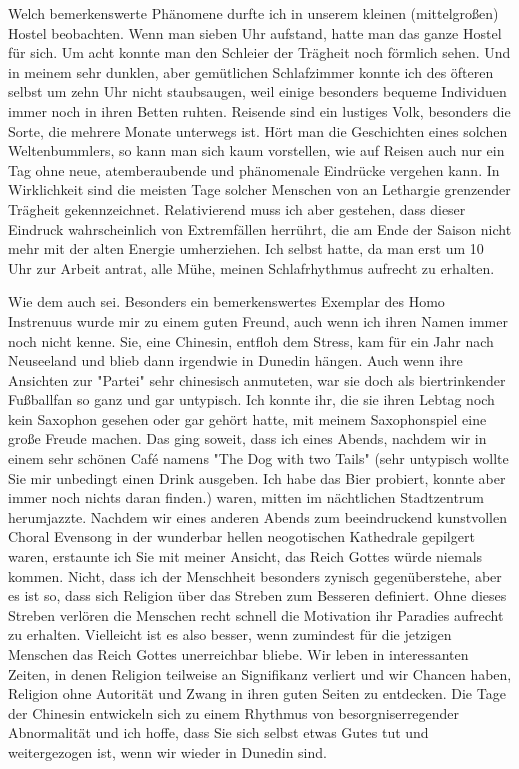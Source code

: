 Welch bemerkenswerte Phänomene durfte ich in unserem kleinen
(mittelgroßen) Hostel beobachten. Wenn man sieben Uhr aufstand, hatte
man das ganze Hostel für sich. Um acht konnte man den Schleier der
Trägheit noch förmlich sehen. Und in meinem sehr dunklen, aber
gemütlichen Schlafzimmer konnte ich des öfteren selbst um zehn Uhr nicht
staubsaugen, weil einige besonders bequeme Individuen immer noch in
ihren Betten ruhten. Reisende sind ein lustiges Volk, besonders die
Sorte, die mehrere Monate unterwegs ist. Hört man die Geschichten eines
solchen Weltenbummlers, so kann man sich kaum vorstellen, wie auf Reisen
auch nur ein Tag ohne neue, atemberaubende und phänomenale Eindrücke
vergehen kann. In Wirklichkeit sind die meisten Tage solcher Menschen
von an Lethargie grenzender Trägheit gekennzeichnet. Relativierend muss
ich aber gestehen, dass dieser Eindruck wahrscheinlich von Extremfällen
herrührt, die am Ende der Saison nicht mehr mit der alten Energie
umherziehen. Ich selbst hatte, da man erst um 10 Uhr zur Arbeit antrat,
alle Mühe, meinen Schlafrhythmus aufrecht zu erhalten.

Wie dem auch sei. Besonders ein bemerkenswertes Exemplar des Homo
Instrenuus wurde mir zu einem guten Freund, auch wenn ich ihren Namen
immer noch nicht kenne. Sie, eine Chinesin, entfloh dem Stress, kam für
ein Jahr nach Neuseeland und blieb dann irgendwie in Dunedin hängen.
Auch wenn ihre Ansichten zur "Partei" sehr chinesisch anmuteten, war sie
doch als biertrinkender Fußballfan so ganz und gar untypisch. Ich konnte
ihr, die sie ihren Lebtag noch kein Saxophon gesehen oder gar gehört
hatte, mit meinem Saxophonspiel eine große Freude machen. Das ging
soweit, dass ich eines Abends, nachdem wir in einem sehr schönen Café
namens "The Dog with two Tails" (sehr untypisch wollte Sie mir unbedingt
einen Drink ausgeben. Ich habe das Bier probiert, konnte aber immer noch
nichts daran finden.) waren, mitten im nächtlichen Stadtzentrum
herumjazzte. Nachdem wir eines anderen Abends zum beeindruckend
kunstvollen Choral Evensong in der wunderbar hellen neogotischen
Kathedrale gepilgert waren, erstaunte ich Sie mit meiner Ansicht, das
Reich Gottes würde niemals kommen. Nicht, dass ich der Menschheit
besonders zynisch gegenüberstehe, aber es ist so, dass sich Religion
über das Streben zum Besseren definiert. Ohne dieses Streben verlören
die Menschen recht schnell die Motivation ihr Paradies aufrecht zu
erhalten. Vielleicht ist es also besser, wenn zumindest für die jetzigen
Menschen das Reich Gottes unerreichbar bliebe. Wir leben in
interessanten Zeiten, in denen Religion teilweise an Signifikanz
verliert und wir Chancen haben, Religion ohne Autorität und Zwang in
ihren guten Seiten zu entdecken. Die Tage der Chinesin entwickeln sich
zu einem Rhythmus von besorgniserregender Abnormalität und ich hoffe,
dass Sie sich selbst etwas Gutes tut und weitergezogen ist, wenn wir
wieder in Dunedin sind.

